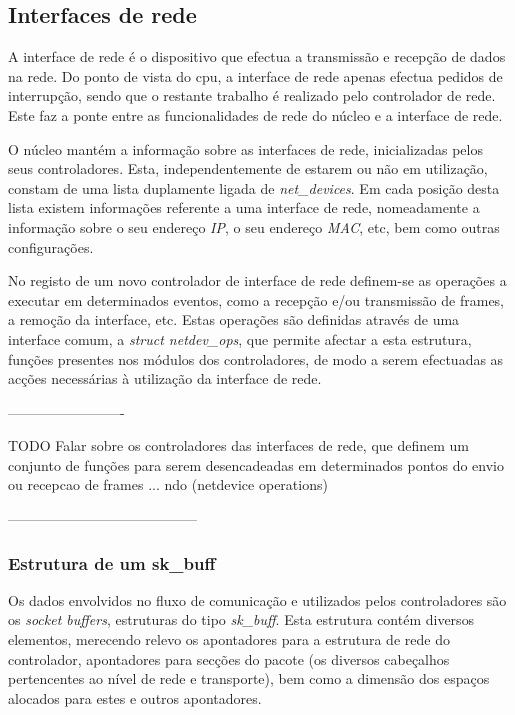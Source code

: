 \subsection{Interfaces de rede}

A interface de rede é o dispositivo que efectua a transmissão e recepção de dados na rede.
Do ponto de vista do cpu, a interface de rede apenas efectua pedidos de interrupção, sendo que o restante trabalho é realizado pelo controlador de rede.
Este faz a ponte entre as funcionalidades de rede do núcleo e a interface de rede.

O núcleo mantém a informação sobre as interfaces de rede, inicializadas pelos seus controladores.
Esta, independentemente de estarem ou não em utilização, constam de uma lista duplamente ligada de \textit{net\_devices}.
Em cada posição desta lista existem informações referente a uma interface de rede, nomeadamente a informação sobre o seu endereço \textit{IP}, o seu endereço \textit{MAC}, etc, bem como outras configurações.

No registo de um novo controlador de interface de rede definem-se as operações a executar em determinados eventos, como a recepção e/ou transmissão de frames, a remoção da interface, etc.
Estas operações são definidas através de uma interface comum, a \textit{struct netdev\_ops}, que permite afectar a esta estrutura, funções presentes nos módulos dos controladores, de modo a serem efectuadas as acções necessárias à utilização da interface de rede.

-------------------------

TODO
Falar sobre os controladores das interfaces de rede, que definem um conjunto de funções para serem desencadeadas em determinados pontos do envio ou recepcao de frames ... ndo (netdevice operations) 
 
-----------------------------------------

\subsubsection{Estrutura de um sk\_buff}
\label{subsub:sk_buff}

Os dados envolvidos no fluxo de comunicação e utilizados pelos controladores são os \textit{socket buffers}, estruturas do tipo \textit{sk\_buff}.
Esta estrutura contém diversos elementos, merecendo relevo os apontadores para a estrutura de rede do controlador, apontadores para secções do pacote (os diversos cabeçalhos pertencentes ao nível de rede e transporte), bem como a dimensão dos espaços alocados para estes e outros apontadores.

